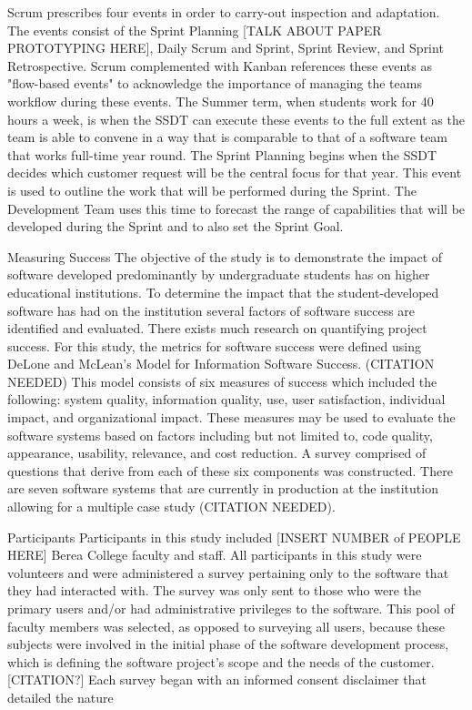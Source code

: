 Scrum prescribes four events in order to carry-out inspection and adaptation. The events consist of the Sprint Planning [TALK ABOUT PAPER PROTOTYPING HERE], Daily Scrum and Sprint, Sprint Review, and Sprint Retrospective. Scrum complemented with Kanban references these events as "flow-based events" to acknowledge the importance of managing the teams workflow during these events. The Summer term, when students work for 40 hours a week, is when the SSDT can execute these events to the full extent as the team is able to convene in a way that is comparable to that of a software team that works full-time year round. The Sprint Planning begins when the SSDT decides which customer request will be the central focus for that year. This event is used to outline the work that will be performed during the Sprint. The Development Team uses this time to forecast the range of capabilities that will be developed during the Sprint and to also set the Sprint Goal.  

 Measuring Success
The objective of the study is to demonstrate the impact of software developed predominantly by undergraduate students has on higher educational institutions. To determine the impact that the student-developed software has had on the institution several factors of software success are identified and evaluated.  There exists much research on quantifying project success. For this study, the metrics for software success were defined using DeLone and McLean’s Model for Information Software Success. (CITATION NEEDED) This model consists of six measures of success which included the following: system quality, information quality, use, user satisfaction, individual impact, and organizational impact. These measures may be used to evaluate the software systems based on factors including but not limited to, code quality, appearance, usability, relevance, and cost reduction.  A survey comprised of questions that derive from each of these six components was constructed. There are seven software systems that are currently in production at the institution allowing for a multiple case study (CITATION NEEDED).

    Participants
Participants in this study included [INSERT NUMBER of PEOPLE HERE] Berea College faculty and staff. All participants in this study were volunteers and were administered a survey pertaining only to the software that they had interacted with. The survey was only sent to those who were the primary users and/or had administrative privileges to the software. This pool of faculty members was selected, as opposed to surveying all users, because these subjects were involved in the initial phase of the software development process, which is defining the software project’s scope and the needs of the customer. [CITATION?] Each survey began with an informed consent disclaimer that detailed the nature

